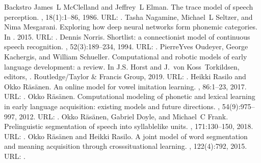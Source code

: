 \documentclass[letterpaper,10pt,english]{jupyterBook}
\begin{document}
\begin{sphinxthebibliography}{Backstro}
\sphinxAtStartPar
James L McClelland and Jeffrey L Elman. The trace model of speech perception. , 18(1):1–86, 1986. URL: .
\sphinxAtStartPar
Tasha Nagamine, Michael L Seltzer, and Nima Mesgarani. Exploring how deep neural networks form phonemic categories. In . 2015. URL: .
\sphinxAtStartPar
Dennis Norris. Shortlist: a connectionist model of continuous speech recognition. , 52(3):189–234, 1994. URL: .
\sphinxAtStartPar
Pierre\sphinxhyphen{}Yves Oudeyer, George Kachergis, and William Schueller. Computational and robotic models of early language development: a review. In J.S. Horst and J. von Koss Torkildsen, editors, . Routledge/Taylor \& Francis Group, 2019. URL: .
\sphinxAtStartPar
Heikki Rasilo and Okko Räsänen. An online model for vowel imitation learning. , 86:1–23, 2017. URL: .
\sphinxAtStartPar
Okko Räsänen. Computational modeling of phonetic and lexical learning in early language acquisition: existing models and future directions. , 54(9):975–997, 2012. URL: .
\sphinxAtStartPar
Okko Räsänen, Gabriel Doyle, and Michael C Frank. Pre\sphinxhyphen{}linguistic segmentation of speech into syllable\sphinxhyphen{}like units. , 171:130–150, 2018. URL: .
\sphinxAtStartPar
Okko Räsänen and Heikki Rasilo. A joint model of word segmentation and meaning acquisition through cross\sphinxhyphen{}situational learning. , 122(4):792, 2015. URL: .

\end{sphinxthebibliography}
\end{document}
